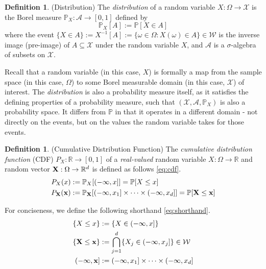 \documentclass[twoside]{article} \usepackage{aistats2017}
\theoremstyle{definition}
\newtheorem{definition}[theorem]{Definition}
\newcommand{\rv}[1]{{#1}}
\begin{document}
	\begin{definition} \label{def:distribution}
		(Distribution)
		The \textit{distribution} of a random variable $\rv{X} : \Omega \to \mathcal{X}$ is the Borel measure $\mathbb{P}_{\rv{X}} : \mathcal{A} \to [0, 1]$ defined by
		\begin{equation}
		\mathbb{P}_{\rv{X}}[A] := \mathbb{P}[\rv{X} \in A]
		\label{eq:distribution}
		\end{equation}
		where the event $\{\rv{X} \in A\} := \rv{X}^{-1}[A] := \{\omega \in \Omega : \rv{X}(\omega) \in A\} \in \mathcal{W}$ is the inverse image (pre-image) of $A \subseteq \mathcal{X}$ under the random variable $\rv{X}$, and $\mathcal{A}$ is a $\sigma$-algebra of subsets on $\mathcal{X}$.
		
		Recall that a random variable (in this case, $\rv{X}$) is formally a map from the sample space (in this case, $\Omega$) to some Borel measurable domain (in this case, $\mathcal{X}$) of interest. The \textit{distribution} is also a probability measure itself, as it satisfies the defining properties of a probability measure, such that $(\mathcal{X}, \mathcal{A}, \mathbb{P}_{\rv{X}})$ is also a probability space. It differs from $\mathbb{P}$ in that it operates in a different domain - not directly on the events, but on the values the random variable takes for those events.
	\end{definition}
	
	\begin{definition} \label{def:cdf}
		(Cumulative Distribution Function)
		The \textit{cumulative distribution function} (CDF) $P_{\rv{X}} : \mathbb{R} \to [0, 1]$ of a \textit{real-valued} random variable $\rv{X} : \Omega \to \mathbb{R}$ and random vector $\bvec{\rv{X}} : \Omega \to \mathbb{R}^{d}$ is defined as follows \eqref{eq:cdf}.
		\begin{equation}
		\begin{aligned}
		P_{\rv{X}}(x) &:= \mathbb{P}_{\rv{X}}[(-\infty, x]] = \mathbb{P}[\rv{X} \leq x] \\
		P_{\bvec{\rv{X}}}(\bvec{x}) &:= \mathbb{P}_{\bvec{\rv{X}}}[(-\infty, x_{1}] \times \dots \times (-\infty, x_{d}]] = \mathbb{P}[\bvec{\rv{X}} \leq \bvec{x}] \\
		\end{aligned}
		\label{eq:cdf}
		\end{equation}
		
		For conciseness, we define the following shorthand \eqref{eq:shorthand}. 
		\begin{equation}
		\begin{aligned}
		\{\rv{X} \leq x\} &:= \{\rv{X} \in (-\infty, x]\} \\
		\{\bvec{\rv{X}} \leq \bvec{x}\} &:= \bigcap\limits_{j = 1}^{d} \{\rv{X}_{j} \in (-\infty, x_{j}]\} \in \mathcal{W} \\
		(-\bvec{\infty}, \bvec{x}] &:= (-\infty, x_{1}] \times \dots \times (-\infty, x_{d}] \\
		\end{aligned}
		\label{eq:shorthand}
		\end{equation}
	\end{definition}
	
\end{document}
